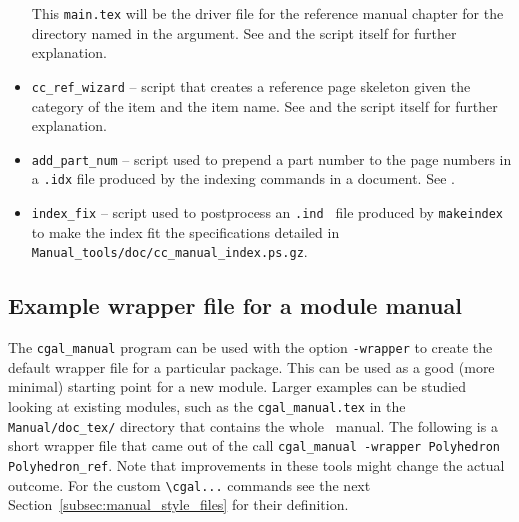 \begin{itemize}
         This {\tt main.tex} will be the driver file for the reference manual 
         chapter for the directory named in the argument. See 
         and the script itself for further explanation.
   \item \verb|cc_ref_wizard|%
         -- script that creates a reference page skeleton
         given the category of the item and the item name. See
         and the script itself for further explanation.
   \item \verb|add_part_num|%
         -- script used to prepend a part number to the 
         page numbers in a {\tt .idx} file produced by the indexing commands in
         a  document.  
         See .
   \item \verb|index_fix|%
         -- script used to postprocess an {\tt .ind } file 
         produced by {\tt makeindex} to make the index fit the specifications
         detailed in %
         {{\tt Manual\_tools/doc/cc\_manual\_index.ps.gz}}.
\end{itemize}
\ccModifierCrossRefOn

\subsection{Example wrapper file for a module manual}
\label{subsec:wrapper_module_manual}

The \texttt{cgal\_manual} program can be used with the option
\texttt{-wrapper} to create the default wrapper file for a particular
package. This can be used as a good (more minimal) starting point for
a new module. Larger examples can be studied looking at existing
modules, such as the \texttt{cgal\_manual.tex} in the
\texttt{Manual/doc\_tex/} directory that contains the whole \cgal\
manual. The following is a short wrapper file that came out of the
call \texttt{cgal\_manual -wrapper Polyhedron Polyhedron\_ref}. Note
that improvements in these tools might change the actual outcome. For
the custom \verb|\cgal...| commands see the next
Section~\ref{subsec:manual_style_files} for their definition.

